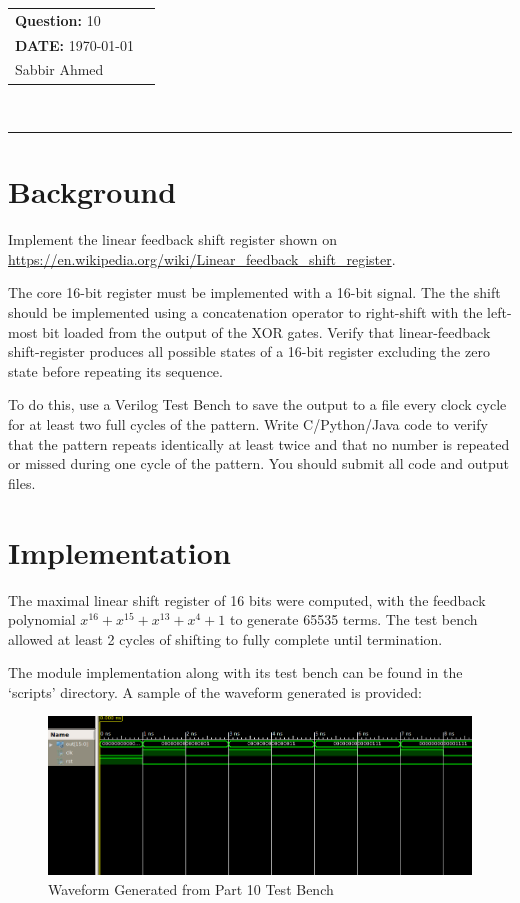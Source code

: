 \documentclass[paper=usletter, fontsize=12pt]{article}
\newcommand{\documentinfo}[3]{
    \begin{centering}
        \parbox{2in}{
        \begin{spacing}{1}
            \begin{flushleft}
                \begin{tabular}{l l}
                    #1 \\
                    #2 \\
                    #3 \\
                \end{tabular}\\
                \rule{\textwidth}{1pt}
            \end{flushleft}
        \end{spacing}
        }
    \end{centering}
}
\begin{document}
    \documentinfo{\textbf{Question:} 10}{\textbf{DATE:} \today}{Sabbir Ahmed}
    \vspace{-0.1in}

    \section{Background}
    Implement the linear feedback shift register shown on \url{https://en.wikipedia.org/wiki/Linear_feedback_shift_register}.

    The core 16-bit register must be implemented with a 16-bit signal. The the shift should be implemented using a concatenation operator to right-shift with the left-most bit loaded from the output of the XOR gates. Verify that linear-feedback shift-register produces all possible states of a 16-bit register excluding the zero state before repeating its sequence.

    To do this, use a Verilog Test Bench to save the output to a file every clock cycle for at least two full cycles of the pattern. Write C/Python/Java code to verify that the pattern repeats identically at least twice and that no number is repeated or missed during one cycle of the pattern. You should submit all code and output files.

    \section{Implementation}
    The maximal linear shift register of 16 bits were computed, with the feedback polynomial $x^{16}+x^{15}+x^{13}+x^{4}+1$ \cite{maxpolynomial} to generate 65535 terms. The test bench allowed at least 2 cycles of shifting to fully complete until termination.

    The module implementation along with its test bench can be found in the `scripts' directory. A sample of the waveform generated is provided:

    \begin{figure}[ht]
        \begin{center}
            \includegraphics[width=1\textwidth]{wav.png}
            \caption{Waveform Generated from Part 10 Test Bench} \label{fig:wav}
        \end{center}
    \end{figure}
\end{document}
